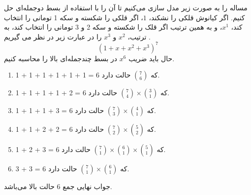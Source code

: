 \p
مساله را به صورت زیر مدل سازی می‌کنیم تا آن را با استفاده از بسط دوجمله‌ای حل کنیم.
اگر کیانوش قلکی را نشکند،
$1$،
اگر قلکی را شکسته و سکه 1 تومانی را انتخاب کند،
$x^1$،
و به همین ترتیب اگر قلک را شکسته و سکه 2 و 3 تومانی را انتخاب کند، به ترتیب،
$x^2$
و
$x^3$
را در عبارت زیر در نظر می گیریم
.
$$(1+x+x^2+x^3)^7$$
حال باید ضریب
$x^6$
در بسط چندجمله‌ای بالا را محاسبه کنیم.

\begin{enumerate}
    \item 
1 + 1 + 1 + 1 + 1 + 1 = 6
که 
$\binom{7}{6}$
حالت دارد.

    \item 
    1 + 1 + 1 + 1 + 2 = 6
که
$\binom{7}{4}\times\binom{3}{1}$
حالت دارد.

    \item 
    1 + 1 + 1 + 3 = 6
که
$\binom{7}{3}\times\binom{4}{1}$
حالت دارد.

    \item 
    1 + 1 + 2 + 2 = 6
که
$\binom{7}{2}\times\binom{5}{2}$
حالت دارد.

    \item 
    1 + 2 + 3 = 6
که
$\binom{7}{1}\times\binom{6}{1}\times\binom{5}{1}$
حالت دارد.

\item 
3 + 3 = 6
که
$\binom{7}{1}\times\binom{6}{1}$
حالت دارد.
\end{enumerate}

\p
جواب نهایی جمع 6 حالت بالا می‌باشد.